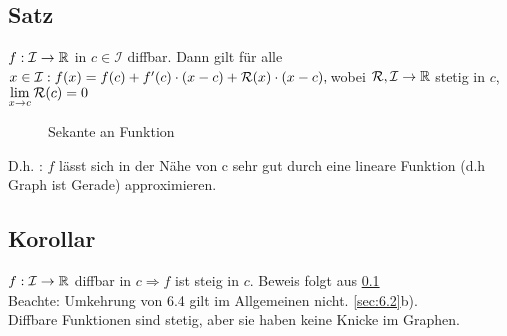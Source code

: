 \subsection[Satz]{Satz}\label{sec:6.3}
$f: \mathcal{I} \to \mathbb{R} $ in $c \in \mathcal{I}$ diffbar.
Dann gilt für alle $x \in \mathcal{I}:\\
f(x) = f(c) + f'(c) \cdot (x-c) + \mathcal{R}(x) \cdot (x-c), \,\\
$wobei $\mathcal{R}, \mathcal{I} \to \mathbb{R}$ stetig in $c$, $\displaystyle \lim_{x \to c}\mathcal{R}(c) = 0$\\
\begin{figure}[h!]
	\centering
	\caption{Sekante an Funktion}
\end{figure}
D.h. : $f$ lässt sich in der Nähe von c sehr gut durch eine lineare Funktion (d.h Graph ist Gerade) approximieren.
\subsection{Korollar}\label{sec:6.4}
$f : \mathcal{I} \to \mathbb{R}$ diffbar in $c
\Rightarrow f$ ist steig in $c$.
Beweis folgt aus \ref{sec:6.3}\\
Beachte: Umkehrung von 6.4 gilt im Allgemeinen nicht. \ref{sec:6.2}b).\\
Diffbare Funktionen sind stetig, aber sie haben keine Knicke im Graphen.
